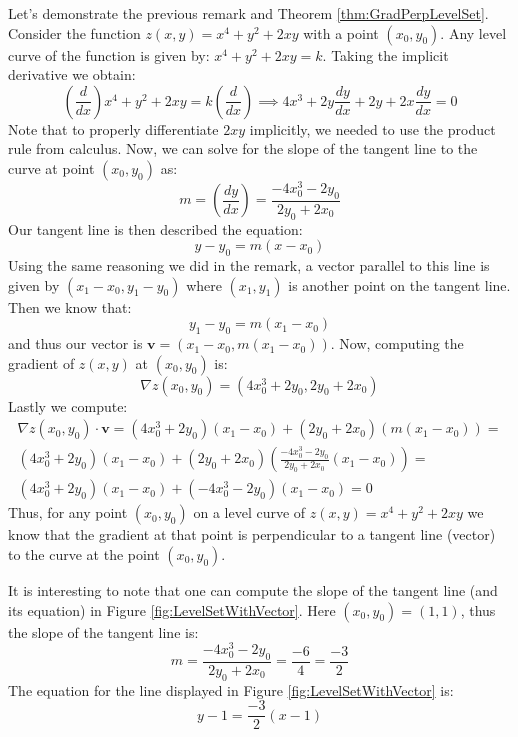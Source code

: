 \begin{example} Let's demonstrate the previous remark and Theorem \ref{thm:GradPerpLevelSet}. Consider the function $z(x,y) = x^4 + y^2 + 2xy$ with a point $(x_0,y_0)$. Any level curve of the function is given by: $x^4 + y^2 + 2xy = k$. Taking the implicit derivative we obtain:
\begin{displaymath}
\left(\frac{d}{dx}\right)x^4 + y^2 + 2xy = k\left(\frac{d}{dx}\right) \implies 
4x^3 + 2y\frac{dy}{dx} + 2y + 2x\frac{dy}{dx} = 0
\end{displaymath}
Note that to properly differentiate $2xy$ implicitly, we needed to use the product rule from calculus. Now, we can solve for the slope of the tangent line to the curve at point $(x_0,y_0)$ as:
\begin{displaymath}
m = \left(\frac{dy}{dx}\right) = \frac{-4x_0^3 - 2y_0}{2y_0 + 2x_0}
\end{displaymath}
Our tangent line is then described the equation:
\begin{displaymath}
y - y_0 = m(x - x_0)
\end{displaymath}
Using the same reasoning we did in the remark, a vector parallel to this line is given by $(x_1 - x_0, y_1 - y_0)$ where $(x_1, y_1)$ is another point on the tangent line. Then we know that:
\begin{displaymath}
y_1 - y_0 = m(x_1 - x_0)
\end{displaymath}
and thus our vector is $\mathbf{v} = (x_1 - x_0, m(x_1 - x_0))$. Now, computing the gradient of $z(x,y)$ at $(x_0,y_0)$ is:
\begin{displaymath}
\nabla z(x_0,y_0) = (4x_0^3 + 2y_0, 2y_0 + 2x_0)
\end{displaymath} 
Lastly we compute:
\begin{multline*}
\nabla z(x_0,y_0)\cdot\mathbf{v} = \left(4x_0^3 + 2y_0\right)(x_1 - x_0) + 
\left(2y_0 + 2x_0\right)\left(m(x_1 - x_0)\right) = \\
\left(4x_0^3 + 2y_0\right)(x_1 - x_0) + \left(2y_0 + 2x_0\right)\left(\frac{-4x_0^3 - 2y_0}{2y_0 + 2x_0}(x_1 - x_0)\right) = \\
\left(4x_0^3 + 2y_0\right)(x_1 - x_0) + \left(-4x_0^3 - 2y_0\right)(x_1 - x_0) = 0
\end{multline*}
Thus, for any point $(x_0,y_0)$ on a level curve of $z(x,y) = x^4 + y^2 + 2xy$ we know that the gradient at that point is perpendicular to a tangent line (vector) to the curve at the point $(x_0,y_0)$. 

It is interesting to note that one can compute the slope of the tangent line (and its equation) in Figure \ref{fig:LevelSetWithVector}. Here $(x_0,y_0) = (1,1)$, thus the slope of the tangent line is:
\begin{displaymath}
m = \frac{-4x_0^3 - 2y_0}{2y_0 + 2x_0} = \frac{-6}{4} = \frac{-3}{2}
\end{displaymath}
The equation for the line displayed in Figure \ref{fig:LevelSetWithVector} is:
\begin{displaymath}
y - 1 = \frac{-3}{2}(x - 1)
\end{displaymath}
\end{example}

